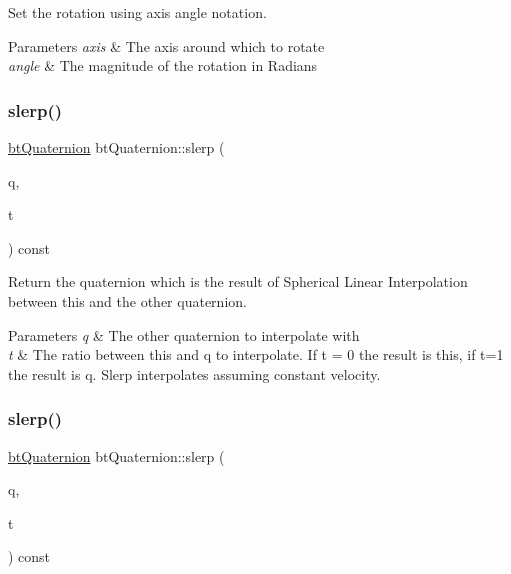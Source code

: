 Set the rotation using axis angle notation. 


\begin{DoxyParams}{Parameters}
{\em axis} & The axis around which to rotate \\
\hline
{\em angle} & The magnitude of the rotation in Radians \\
\hline
\end{DoxyParams}
\mbox{\label{classbtQuaternion_a0b34cbf669afb05d0618ff100a76b0dc}} 
\subsubsection{\texorpdfstring{slerp()}{slerp()}\hspace{0.1cm}{\footnotesize\ttfamily [1/2]}}
{\footnotesize\ttfamily \hyperlink{classbtQuaternion}{bt\+Quaternion} bt\+Quaternion\+::slerp (\begin{DoxyParamCaption}\item[{const \hyperlink{classbtQuaternion}{bt\+Quaternion} \&}]{q,  }\item[{const bt\+Scalar \&}]{t }\end{DoxyParamCaption}) const\hspace{0.3cm}{\ttfamily [inline]}}



Return the quaternion which is the result of Spherical Linear Interpolation between this and the other quaternion. 


\begin{DoxyParams}{Parameters}
{\em q} & The other quaternion to interpolate with \\
\hline
{\em t} & The ratio between this and q to interpolate. If t = 0 the result is this, if t=1 the result is q. Slerp interpolates assuming constant velocity. \\
\hline
\end{DoxyParams}
\mbox{\label{classbtQuaternion_a0b34cbf669afb05d0618ff100a76b0dc}} 
\subsubsection{\texorpdfstring{slerp()}{slerp()}\hspace{0.1cm}{\footnotesize\ttfamily [2/2]}}
{\footnotesize\ttfamily \hyperlink{classbtQuaternion}{bt\+Quaternion} bt\+Quaternion\+::slerp (\begin{DoxyParamCaption}\item[{const \hyperlink{classbtQuaternion}{bt\+Quaternion} \&}]{q,  }\item[{const bt\+Scalar \&}]{t }\end{DoxyParamCaption}) const\hspace{0.3cm}{\ttfamily [inline]}}



